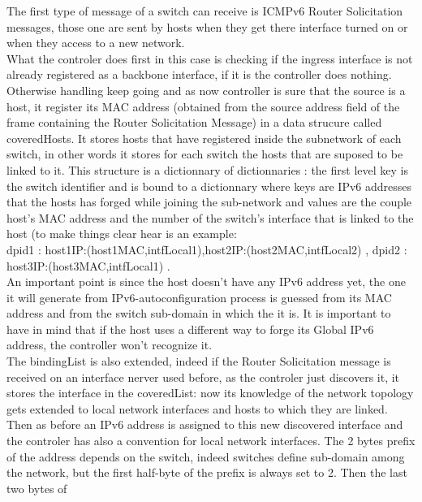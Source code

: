 \documentclass{article}
\begin{document}
The first type of message of a switch can receive is ICMPv6 Router
Solicitation messages, those one are sent by hosts when they get there
interface turned on or when they access to a new network.\\ 
\newline
What the controler does first in this case is checking if the ingress
interface is not already registered as a backbone interface, if it is
the controller does nothing. Otherwise handling keep going and as now
controller is sure that the source is a host, it register its MAC
address (obtained from the source address field of the frame
containing the Router Solicitation Message) in a data strucure called
coveredHosts. It stores hosts that have registered inside the
subnetwork of each switch, in other words it stores for each switch
the hosts that are suposed to be linked to it. This structure is a
dictionnary of dictionnaries : the first level key is the switch
identifier and is bound to a dictionnary where keys are IPv6 addresses
that the hosts has forged while joining the sub-network and values are
the couple host's MAC address and the number of the switch's interface
that is linked to the host (to make things clear hear is an example:\\
{dpid1 : {host1IP:(host1MAC,intfLocal1),host2IP:(host2MAC,intfLocal2)}
, dpid2 : {host3IP:(host3MAC,intfLocal1)} }. \\
\newline
An important point is since the host doesn't have any IPv6 address
yet, the one it will generate from IPv6-autoconfiguration process is
guessed from its MAC address and from the switch sub-domain in which
the it is. It is important to have in mind that if the host uses a
different way to forge its Global IPv6 address, the controller won't
recognize it.\\
\newline
The bindingList is also extended, indeed if the Router Solicitation
message is received on an interface nerver used before, as the
controler just discovers it, it stores the interface in the
coveredList: now its knowledge of the network topology gets extended
to local network interfaces and hosts to which they are linked. Then
as before an IPv6 address is assigned to this new discovered interface
and the controler has also a convention for local network
interfaces. The 2 bytes prefix of the address depends on the switch,
indeed switches define sub-domain among the network, but the first
half-byte of the prefix is always set to 2. Then the last two bytes of
\end{document}

